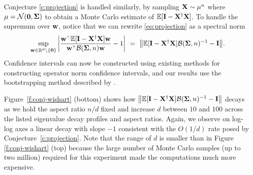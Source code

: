 Conjecture \ref{c:projection} is handled similarly, by sampling
$\mathbf X\sim\mu^n$ where $\mu=\mathcal{N}(\mathbf 0,\mathbf{\Sigma} )$ to obtain a Monte Carlo estimate of
$\mathbb E[\mathbf I-\mathbf X^\dagger\mathbf X]$. To handle the supremum over $\mathbf w$, notice that
we can rewrite \eqref{eq:projection} as a spectral norm
\begin{align}
  \sup_{\w\in\R^d\backslash\{\zero\}}\bigg|\frac{\w^\top\E[\I-\X^\dagger\X]\w}{\w^\top
  \Bc(\Sigmab,n)\w} - 1\bigg|
\  =\ \big\|\E[\I-\X^\dagger\X]\Bc(\Sigmab,n)^{-1}
  - \I\big\|.
  \label{eq:proj-to-operator-norm}
\end{align}
Confidence intervals can now be constructed
using existing methods for constructing operator norm
confidence intervals, and our results use the bootstrapping
method described by \cite{lopes2019bootstrapping}.

Figure~\ref{f:conj-wishart} (bottom) shows
how $\big\|\mathbb E[\mathbf I-\mathbf X^\dagger\mathbf X]\mathcal{B}(\mathbf{\Sigma},n)^{-1} - \mathbf I\big\|$ decays as we
hold the aspect ratio $n/d$ fixed and increase $d$ between $10$ and
$100$ across the listed
eigenvalue decay profiles and aspect ratios. Again, we observe on
log-log axes a linear decay with slope $-1$ consistent with the $O(1/d)$
rate posed by Conjecture~\ref{c:projection}. Note that the range of
$d$ is smaller than in Figure \ref{f:conj-wishart} (top) because the large
number of Monte Carlo samples (up to two million) required for this
experiment made the computations much more expensive.

